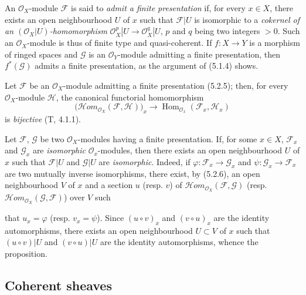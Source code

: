 \begin{env}[5.2.5]
\label{0.5.2.5}
An $\mathcal{O}_X$-module $\mathcal{F}$ is said to \emph{admit a finite
presentation} if, for every $x\in X$, there exists an open neighbourhood $U$ of $x$ such
that $\mathcal{F}|U$ is isomorphic to a \emph{cokernel of an
$(\mathcal{O}_X|U)$-homomorphism}
$\mathcal{O}_X^p|U\to\mathcal{O}_X^q|U$, $p$ and $q$ being two integers $>0$.
Such an $\mathcal{O}_X$-module is thus of finite type and quasi-coherent. If
$f:X\to Y$ is a morphism of ringed spaces and $\mathcal{G}$ is an
$\mathcal{O}_Y$-module admitting a finite presentation, then
$f^*(\mathcal{G})$ admits a finite presentation, as the
argument of (5.1.4) shows.
\end{env}

\begin{env}[5.2.6]
\label{0.5.2.6}
Let $\mathcal{F}$ be an $\mathcal{O}_X$-module admitting a finite presentation
(5.2.5); then, for every $\mathcal{O}_X$-module $\mathcal{H}$,
the canonical functorial homomorphism
\[
  \bigl(\mathcal{H}\!om_{\mathcal{O}_X}(\mathcal{F},\mathcal{H})\bigr)_x
  \longrightarrow
  \operatorname{Hom}_{\mathcal{O}_x}(\mathcal{F}_x,\mathcal{H}_x)
\]
is \emph{bijective} (T, 4.1.1).
\end{env}

\begin{env}[5.2.7]
\label{0.5.2.7}
Let $\mathcal{F}$, $\mathcal{G}$ be two $\mathcal{O}_X$-modules having a
finite presentation. If, for some $x\in X$, $\mathcal{F}_x$ and $\mathcal{G}_x$
are \emph{isomorphic} $\mathcal{O}_x$-modules, then there exists an open
neighbourhood $U$ of $x$ such that $\mathcal{F}|U$ and $\mathcal{G}|U$ are
\emph{isomorphic}. Indeed, if
$\varphi:\mathcal{F}_x\to\mathcal{G}_x$ and
$\psi:\mathcal{G}_x\to\mathcal{F}_x$ are two mutually inverse isomorphisms, there
exist, by (5.2.6), an open neighbourhood $V$ of $x$ and a section $u$
(resp. $v$) of
$\mathcal{H}\!om_{\mathcal{O}_X}(\mathcal{F},\mathcal{G})$ (resp.
$\mathcal{H}\!om_{\mathcal{O}_X}(\mathcal{G},\mathcal{F})$) over $V$
such


that $u_x=\varphi$ (resp. $v_x=\psi$). Since $(u\circ v)_x$ and
$(v\circ u)_x$ are the identity automorphisms, there exists an open
neighbourhood $U\subset V$ of $x$ such that $(u\circ v)|U$ and $(v\circ u)|U$ are the
identity automorphisms, whence the proposition.
\end{env}

\subsection{Coherent sheaves}
\label{subsection:0.5.3}

